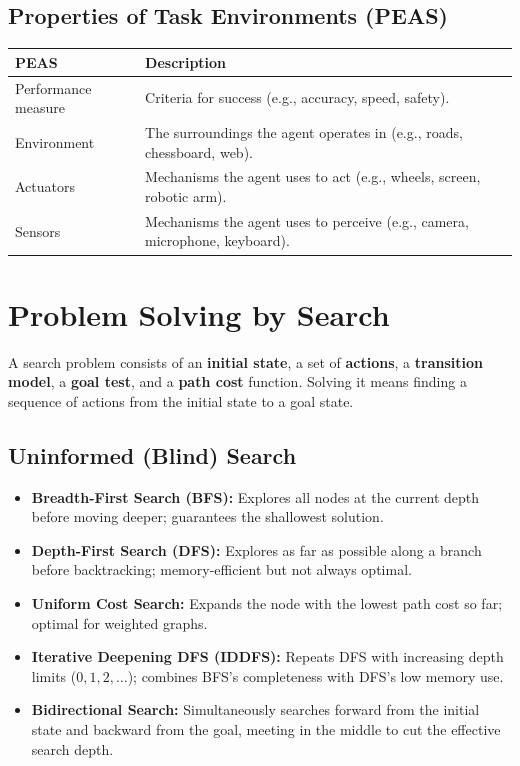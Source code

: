 \documentclass[11pt,a4paper]{article}
\begin{document}
\subsection{Properties of Task Environments (PEAS)}
\begin{longtable}{@{}p{2.2cm}p{11.3cm}@{}}
\toprule
\rowcolor{primary!15}
\textbf{PEAS} & \textbf{Description} \\
\midrule
\endhead
Performance measure & Criteria for success (e.g., accuracy, speed, safety). \\
\addlinespace
Environment & The surroundings the agent operates in (e.g., roads, chessboard, web). \\
\addlinespace
Actuators & Mechanisms the agent uses to act (e.g., wheels, screen, robotic arm). \\
\addlinespace
Sensors & Mechanisms the agent uses to perceive (e.g., camera, microphone, keyboard). \\
\bottomrule
\end{longtable}

\section{Problem Solving by Search}

\begin{definitionbox}
A search problem consists of an \textbf{initial state}, a set of \textbf{actions}, a \textbf{transition model}, a \textbf{goal test}, and a \textbf{path cost} function. Solving it means finding a sequence of actions from the initial state to a goal state.
\end{definitionbox}

\subsection{Uninformed (Blind) Search}
\begin{itemize}[leftmargin=*]
  \item \textbf{Breadth-First Search (BFS):} Explores all nodes at the current depth before moving deeper; guarantees the shallowest solution.
  \item \textbf{Depth-First Search (DFS):} Explores as far as possible along a branch before backtracking; memory-efficient but not always optimal.
  \item \textbf{Uniform Cost Search:} Expands the node with the lowest path cost so far; optimal for weighted graphs.
  \item \textbf{Iterative Deepening DFS (IDDFS):} Repeats DFS with increasing depth limits ($0, 1, 2, \ldots$); combines BFS's completeness with DFS's low memory use.
  \item \textbf{Bidirectional Search:} Simultaneously searches forward from the initial state and backward from the goal, meeting in the middle to cut the effective search depth.
\end{itemize}
\end{document}

